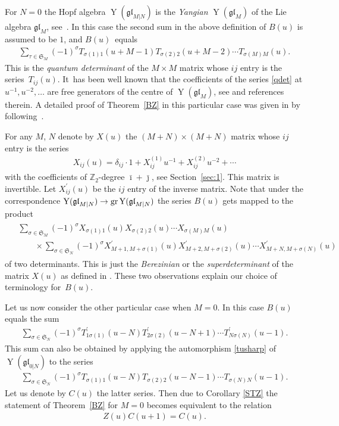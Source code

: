 \documentclass[pdftex]{sigma}
\numberwithin{equation}{section}
\def\1{^{-1}}
\def\bi{{\bar\imath }}
\def\bj{{\bar\jmath }}
\def\de{\delta}
\def\glMN{\mathfrak{gl}_{M|N}}
\def\gr{{\rm gr} }
\def\si{\sigma}
\def\Sym{\mathfrak{S}}
\def\TP{T^{\prime}}
\def\XP{X^{\prime}}
\def\YMN{\operatorname{Y}(\glMN)}
\def\ZZ{\mathbb{Z}}
\begin{document}
For $N=0$ the Hopf algebra $\YMN$ is
the \textit{Yangian} $\operatorname{Y}(\mathfrak{gl}_M)$
of the Lie algebra $\mathfrak{gl}_M $, see~\cite{MNO}.
In this case the second sum in the above
definition of $B(u)$ is assumed to be $1 $, and $B(u)$~equals
\begin{gather}\label{qdet}
 \sum_{\tau\in\Sym_M} (-1)^\si
T_{\si(1) 1}(u+M-1) T_{\si(2) 2}(u+M-2)\cdots T_{\si(M) M}(u) .
\end{gather}
This is the \emph{quantum determinant} of the $M\times M$ matrix
whose $ij$ entry is the series~$T_{ij}(u) $.
It~has been well known that
the coefficients of the series \eqref{qdet}
at $u\1,u^{-2}, \dots$ are free generators of the centre of $\operatorname{Y}(\mathfrak{gl}_M) $,
see \cite[Section~2]{MNO} and references therein.
A detailed proof of Theorem~\ref{BZ} in this particular case was given in
\cite[Section~5]{MNO} by following~\cite{N1}.

For any $M$, $N$ denote by $X(u)$ the $(M+N)\times(M+N)$ matrix whose $ij$ entry is the series
\begin{gather*}
X_{ij}(u)= \de_{ij}\cdot1+X_{ij}^{(1)} u^{-1}+X_{ij}^{(2)} u^{-2}+\cdots
\end{gather*}
with the coefficients of $\ZZ_2 $-degree $\bi+\bj $, see
Section~\ref{sec:1}. This matrix is invertible.
Let $\XP_{ij}(u)$ be the $ij$ entry of the inverse matrix.
Note that under the correspondence $\YMN\to\gr\YMN$
the series $B(u)$ gets mapped
to the product
\begin{gather*}
\begin{split} &
 \sum_{\si\in\Sym_M} (-1)^\si X_{\si(1)1}(u) X_{\si(2)2}(u)\cdots X_{\si(M)M}(u)\\
& \qquad{}\times\sum_{\si\in\Sym_N} (-1)^\si \XP_{M+1,M+\si(1)}(u) \XP_{M+2,M+\si(2)}(u)\cdots\XP_{M+N,M+\si(N)}(u)
\end{split}
\end{gather*}
of two determinants. This is just the \textit{Berezinian} or the
\emph{superdeterminant} of the matrix $X(u)$ as defined in \cite[Section~I.3.1]{B}.
These two observations explain our choice of
terminology for~$B(u)$.

Let us now consider the other particular case when $M=0 $.
In this case $B(u)$ equals the sum
\begin{gather*}
 \sum_{\si\in\Sym_N} (-1)^\si \TP_{1 \si(1)}(u-N) \TP_{2 \si(2)}(u-N+1)\cdots\TP_{N \si(N)}(u-1) .
\end{gather*}
This sum can also be obtained by applying the automorphism
\eqref{tusharp} of $\operatorname{Y}(\mathfrak{gl}_{0 |N})$ to the series
\begin{gather*}
\sum_{\si\in\Sym_N} (-1)^\si T_{\si(1) 1}(u-N) T_{\si(2) 2}(u-N-1)\cdots T_{\si(N) N}(u-1) .
\end{gather*}
Let us denote by $C(u)$ the latter series. Then due to Corollary \ref{STZ}
the statement of Theorem~\ref{BZ} for $M=0$ becomes equivalent to the relation
\begin{gather}\label{AZ}
Z(u) C(u+1)=C(u) .
\end{gather}
\end{document}
